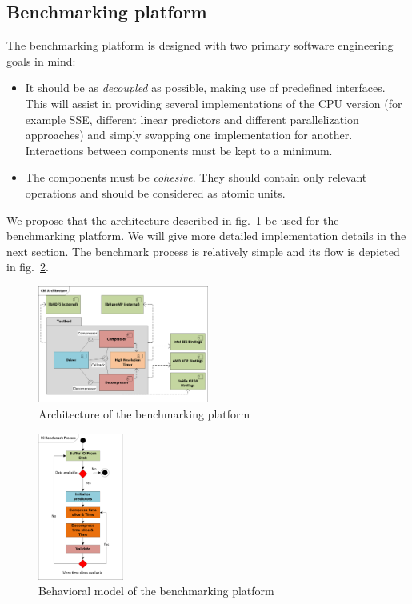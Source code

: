 \documentclass{acm_proc_article-sp}
\begin{document}
\subsection{Benchmarking platform}
The benchmarking platform is designed with two primary software engineering goals in mind:
\begin{itemize}
 \item It should be as \textit{decoupled} as possible, making use of predefined interfaces. This will assist in providing several implementations of the CPU version (for example SSE, different linear predictors and different parallelization
 approaches) and simply swapping one implementation for another. Interactions between components must be kept to a minimum.
 \item The components must be \textit{cohesive}. They should contain only relevant operations and should be considered as atomic units.
\end{itemize}
We propose that the architecture described in fig.~\ref{TOOL_ARCH} be used for the benchmarking platform. We will give more detailed implementation details in the next section. The benchmark process is relatively simple
and its flow is depicted in fig.~\ref{TOOL_FLOW}.
\begin{figure}[h!]
 \centering
 \includegraphics[width=0.50\textwidth]{Thesis_Arc.png}
 \caption{Architecture of the benchmarking platform}
 \label{TOOL_ARCH}
\end{figure}
\begin{figure}[h!]
 \centering
 \includegraphics[width=0.25\textwidth]{Thesis_Flow.png}
 \caption{Behavioral model of the benchmarking platform}
 \label{TOOL_FLOW}
\end{figure}
\end{document}
